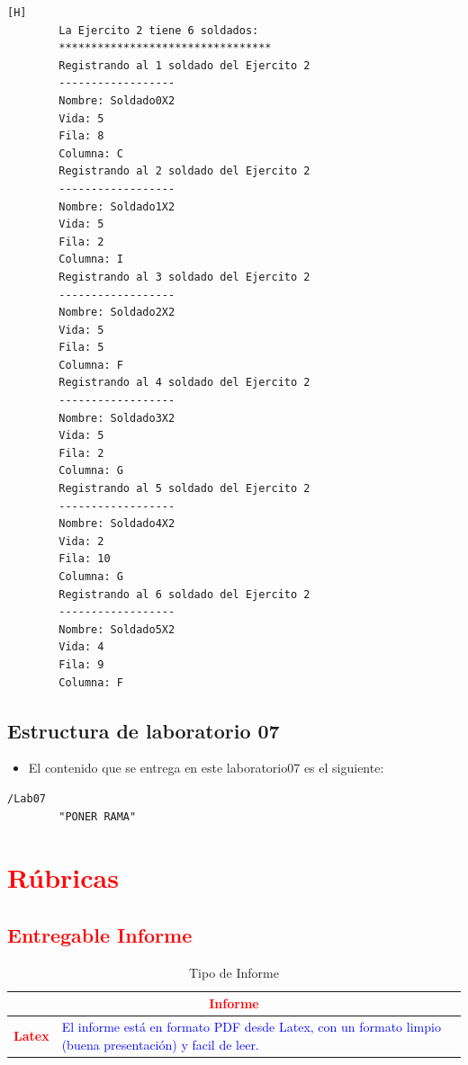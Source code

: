\documentclass{article}
\begin{document}
	\begin{lstlisting}[language=bash,caption={Ejecucion:}][H]
		La Ejercito 2 tiene 6 soldados:
		*********************************
		Registrando al 1 soldado del Ejercito 2
		------------------
		Nombre: Soldado0X2
		Vida: 5
		Fila: 8
		Columna: C
		Registrando al 2 soldado del Ejercito 2
		------------------
		Nombre: Soldado1X2
		Vida: 5
		Fila: 2
		Columna: I
		Registrando al 3 soldado del Ejercito 2
		------------------
		Nombre: Soldado2X2
		Vida: 5
		Fila: 5
		Columna: F
		Registrando al 4 soldado del Ejercito 2
		------------------
		Nombre: Soldado3X2
		Vida: 5
		Fila: 2
		Columna: G
		Registrando al 5 soldado del Ejercito 2
		------------------
		Nombre: Soldado4X2
		Vida: 2
		Fila: 10
		Columna: G
		Registrando al 6 soldado del Ejercito 2
		------------------
		Nombre: Soldado5X2
		Vida: 4
		Fila: 9
		Columna: F
	\end{lstlisting}
	\subsection{Estructura de laboratorio 07}
	\begin{itemize}	
		\item El contenido que se entrega en este laboratorio07 es el siguiente:
	\end{itemize}
	\begin{lstlisting}[style=ascii-tree]
	/Lab07	
		"PONER RAMA"
	\end{lstlisting}    
	\section{\textcolor{red}{Rúbricas}}
	
	\subsection{\textcolor{red}{Entregable Informe}}
	\begin{table}[H]
		\caption{Tipo de Informe}
		\setlength{\tabcolsep}{0.5em} %
		{\renewcommand{\arraystretch}{1.5}%
		\begin{tabular}{|p{3cm}|p{12cm}|}
			\hline
			\multicolumn{2}{|c|}{\textbf{\textcolor{red}{Informe}}}  \\
			\hline 
			\textbf{\textcolor{red}{Latex}} & \textcolor{blue}{El informe está en formato PDF desde Latex,  con un formato limpio (buena presentación) y facil de leer.}   \\ 
			\hline 
			
			
		\end{tabular}
	}
	\end{table}
	
\end{document}

